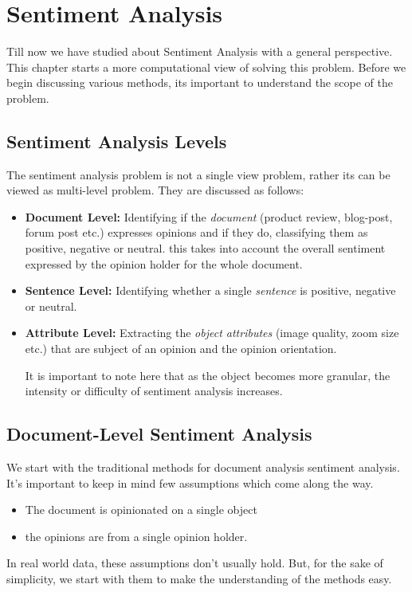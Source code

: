 \chapter{Sentiment Analysis}\label{chapter:sentiment}
Till now we have studied about Sentiment Analysis with a general perspective. This chapter starts a more computational view of solving this problem. Before we begin discussing various methods, its important to understand the scope of the problem. 
\section{Sentiment Analysis Levels}
The sentiment analysis problem is not a single view problem, rather its can be viewed as multi-level problem. They are discussed as follows:
\begin{itemize}
\item \textbf{Document Level: }Identifying if the \textit{document} (product review, blog-post, forum post etc.) expresses opinions and if they do, classifying them as positive, negative or neutral. this takes into account the overall sentiment expressed by the opinion holder for the whole document.  
\item \textbf{Sentence Level: }Identifying whether a single \textit{sentence} is positive, negative or neutral.
\item \textbf{Attribute Level: }Extracting the \textit{object attributes} (image quality, zoom size etc.) that are subject of an opinion and the opinion orientation.

It is important to note here that as the object becomes more granular, the intensity or difficulty of sentiment analysis increases.
\end{itemize}

\section{Document-Level Sentiment Analysis}
We start with the traditional methods for document analysis sentiment analysis. It's important to keep in mind few assumptions which come along the way. 
\begin{itemize}
\item The document is opinionated on a single object
\item the opinions are from a single opinion holder.
\end{itemize}
In real world data, these assumptions don't usually hold. But, for the sake of simplicity, we start with them to make the understanding of the methods easy.

